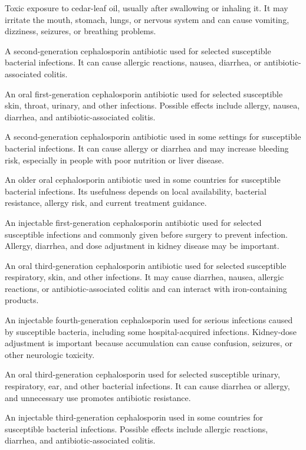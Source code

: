  Toxic exposure to cedar-leaf oil, usually after swallowing or inhaling it. It may irritate the mouth, stomach, lungs, or nervous system and can cause vomiting, dizziness, seizures, or breathing problems.

 A second-generation cephalosporin antibiotic used for selected susceptible bacterial infections. It can cause allergic reactions, nausea, diarrhea, or antibiotic-associated colitis.

 An oral first-generation cephalosporin antibiotic used for selected susceptible skin, throat, urinary, and other infections. Possible effects include allergy, nausea, diarrhea, and antibiotic-associated colitis.

 A second-generation cephalosporin antibiotic used in some settings for susceptible bacterial infections. It can cause allergy or diarrhea and may increase bleeding risk, especially in people with poor nutrition or liver disease.

 An older oral cephalosporin antibiotic used in some countries for susceptible bacterial infections. Its usefulness depends on local availability, bacterial resistance, allergy risk, and current treatment guidance.

 An injectable first-generation cephalosporin antibiotic used for selected susceptible infections and commonly given before surgery to prevent infection. Allergy, diarrhea, and dose adjustment in kidney disease may be important.

 An oral third-generation cephalosporin antibiotic used for selected susceptible respiratory, skin, and other infections. It may cause diarrhea, nausea, allergic reactions, or antibiotic-associated colitis and can interact with iron-containing products.

 An injectable fourth-generation cephalosporin used for serious infections caused by susceptible bacteria, including some hospital-acquired infections. Kidney-dose adjustment is important because accumulation can cause confusion, seizures, or other neurologic toxicity.

 An oral third-generation cephalosporin used for selected susceptible urinary, respiratory, ear, and other bacterial infections. It can cause diarrhea or allergy, and unnecessary use promotes antibiotic resistance.

 An injectable third-generation cephalosporin used in some countries for susceptible bacterial infections. Possible effects include allergic reactions, diarrhea, and antibiotic-associated colitis.

